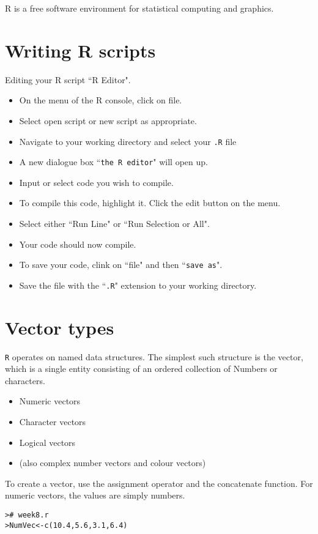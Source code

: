\documentclass[a4paper,12pt]{article}
\begin{document}
\begin{itemize}
R is a free software environment for statistical computing and graphics.

\section{Writing R scripts}
Editing your R script ``R Editor".
\begin{itemize}
\item On the menu of the R console, click on file.
\item Select open script or new script as appropriate.
\item Navigate to your working directory and select your \texttt{.R} file
\item A new dialogue box ``\texttt{the R editor}" will open up.
\item Input or select code you wish to compile.
\item To compile this code, highlight it. Click the edit button on the menu.
\item Select either ``Run Line" or ``Run Selection or All".
\item Your code should now compile.
\item To save your code, clink on ``file" and then ``\texttt{save as}".
\item Save the file with the ``\texttt{.R}" extension to your working directory.
\end{itemize}

\section{Vector types}
\texttt{R} operates on named data structures. The simplest such structure is the
vector, which is a single entity consisting of an ordered collection of
Numbers or characters.

\begin{itemize}
\item Numeric vectors
\item Character vectors
\item Logical vectors
\item (also complex number vectors and colour vectors)
\end{itemize}

To create a vector, use the assignment operator and the concatenate function.
For numeric vectors, the values are simply numbers.

\begin{verbatim}
># week8.r
>NumVec<-c(10.4,5.6,3.1,6.4)
\end{verbatim}


\end{itemize}
\end{document}
